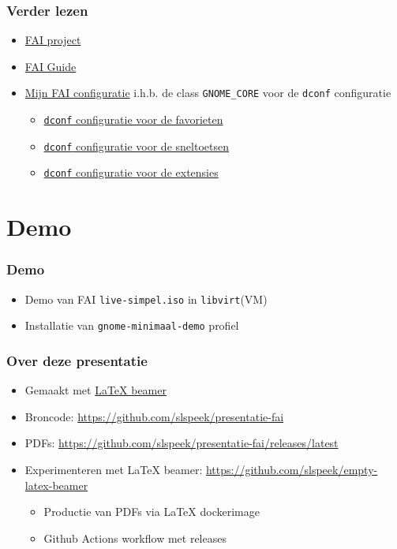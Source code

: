 \documentclass{beamer}
\newcommand{\reponame}{presentatie-fai}
\begin{document}
\begin{frame}
\frametitle{Verder lezen}
\begin{itemize}
  \item \href{https://fai-project.org/}{FAI project}
  \item \href{https://fai-project.org/fai-guide/}{FAI Guide}
  \item \href{https://github.com/slspeek/fai/}{Mijn FAI configuratie} i.h.b. 
  de class \texttt{GNOME\_CORE} voor de \texttt{dconf} configuratie
  \begin{itemize}
    \item \href{https://github.com/slspeek/fai/blob/main/files/etc/dconf/db/local.d/00-favorite-apps/DEVELOPER}{\texttt{dconf} configuratie voor de favorieten}
    \item \href{https://github.com/slspeek/fai/blob/main/files/etc/dconf/db/local.d/10-shortcuts/GNOME_CORE}{\texttt{dconf} configuratie voor de sneltoetsen}
    \item \href{https://github.com/slspeek/fai/blob/main/files/etc/dconf/db/local.d/40-gnome-extensions/GNOME_EXTENSIONS}{\texttt{dconf} configuratie voor de extensies}
  \end{itemize}
  \end{itemize}
\end{frame}

\section{Demo}
\begin{frame}
\frametitle{Demo}
\begin{itemize}
  \item Demo van FAI \texttt{live-simpel.iso} in \texttt{libvirt}(VM)
  \item Installatie van \texttt{gnome-minimaal-demo} profiel
\end{itemize}
\end{frame}

\begin{frame}
\frametitle{Over deze presentatie}
\begin{itemize}
  \item Gemaakt met \href{https://nl.mirrors.cicku.me/ctan/macros/latex/contrib/beamer/doc/beameruserguide.pdf}{\LaTeX{} beamer}
  \item Broncode: \url{https://github.com/slspeek/\reponame}
  \item PDFs: \url{https://github.com/slspeek/\reponame/releases/latest}
  \item Experimenteren met \LaTeX{} beamer: \url{https://github.com/slspeek/empty-latex-beamer}
  \begin{itemize}
    \item Productie van PDFs via \LaTeX{} dockerimage
    \item Github Actions workflow met releases
  \end{itemize}
\end{itemize}
\end{frame}
\end{document}
